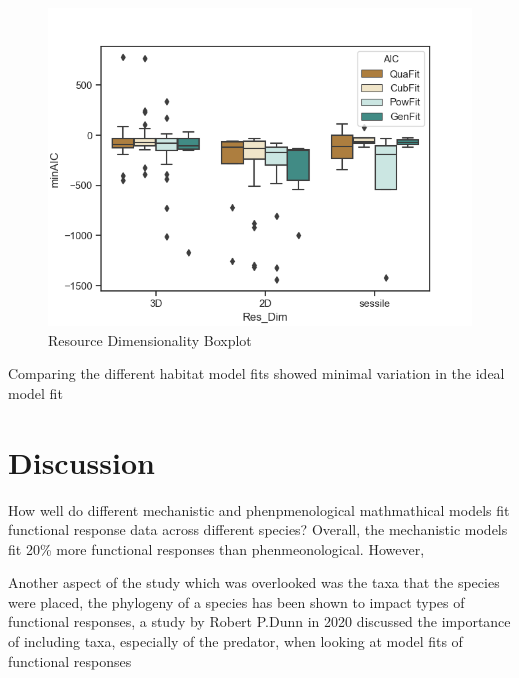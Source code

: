 \documentclass[11pt]{article}
\begin{document}
\begin{figure}[h!]
	
	\includegraphics[]{Res_Dim_Compare.png}
	\caption{Resource Dimensionality Boxplot}
	\label{Resource Dimensionality Boxplot}
	
\end{figure}

Comparing the different habitat model fits showed minimal variation in the ideal model fit 


	\section{Discussion}
\noindent

How well do different mechanistic and phenpmenological mathmathical models fit functional response data across different species?
Overall, the mechanistic models fit 20\% more functional responses than phenmeonological. However, 


Another aspect of the study which was overlooked was the taxa that the species were placed, the phylogeny of a species has been shown to impact types of functional responses, a study by Robert P.Dunn in 2020 discussed the importance of including taxa, especially of the predator, when looking at model fits of functional responses

	
\newpage


\vspace*{1\baselineskip}
\printbibliography 


\newpage
\end{document}
